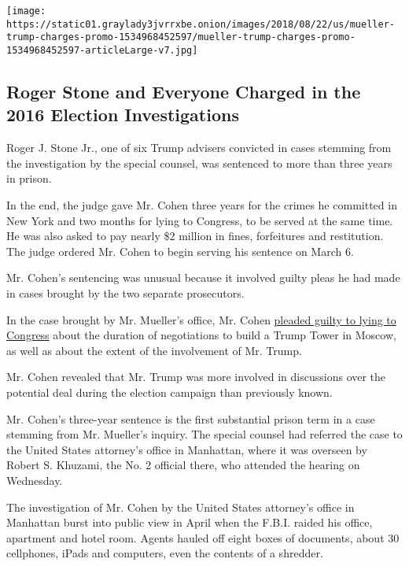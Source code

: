 \texttt{[image: https://static01.graylady3jvrrxbe.onion/images/2018/08/22/us/mueller-trump-charges-promo-1534968452597/mueller-trump-charges-promo-1534968452597-articleLarge-v7.jpg]}

\hypertarget{roger-stone-and-everyone-charged-in-the-2016-election-investigations}{%
\subsection{Roger Stone and Everyone Charged in the 2016 Election
Investigations}\label{roger-stone-and-everyone-charged-in-the-2016-election-investigations}}

Roger J. Stone Jr., one of six Trump advisers convicted in cases
stemming from the investigation by the special counsel, was sentenced to
more than three years in prison.

In the end, the judge gave Mr. Cohen three years for the crimes he
committed in New York and two months for lying to Congress, to be served
at the same time. He was also asked to pay nearly \$2 million in fines,
forfeitures and restitution. The judge ordered Mr. Cohen to begin
serving his sentence on March 6.

Mr. Cohen's sentencing was unusual because it involved guilty pleas he
had made in cases brought by the two separate prosecutors.

In the case brought by Mr. Mueller's office, Mr. Cohen
\href{https://www.nytimes3xbfgragh.onion/2018/11/29/nyregion/michael-cohen-trump-russia-mueller.html}{pleaded
guilty to lying to Congress} about the duration of negotiations to build
a Trump Tower in Moscow, as well as about the extent of the involvement
of Mr. Trump.

Mr. Cohen revealed that Mr. Trump was more involved in discussions over
the potential deal during the election campaign than previously known.

Mr. Cohen's three-year sentence is the first substantial prison term in
a case stemming from Mr. Mueller's inquiry. The special counsel had
referred the case to the United States attorney's office in Manhattan,
where it was overseen by Robert S. Khuzami, the No. 2 official there,
who attended the hearing on Wednesday.

The investigation of Mr. Cohen by the United States attorney's office in
Manhattan burst into public view in April when the F.B.I. raided his
office, apartment and hotel room. Agents hauled off eight boxes of
documents, about 30 cellphones, iPads and computers, even the contents
of a shredder.

